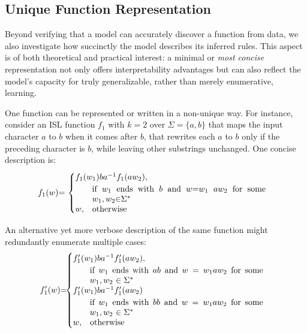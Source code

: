 \subsection{Unique Function Representation}
Beyond verifying that a model can accurately discover a function from data, we also investigate how succinctly the model describes its inferred rules. This aspect is of both theoretical and practical interest: a minimal or \emph{most concise} representation not only offers interpretability advantages but can also reflect the model's capacity for truly generalizable, rather than merely enumerative, learning. 

One function can be represented or written in a non-unique way. For instance, consider an ISL function $f_1$ with $k=2$ over $\Sigma = \{a, b\}$ that maps the input character $a$ to $b$ when it comes after $b$, that rewrites each $a$ to $b$ only if the preceding character is $b$, while leaving other substrings unchanged. One concise description is:
\begin{equation}
\hspace{-3mm} f_1(w) {=}\,
  \begin{cases}
 f_1(w_1)ba^{-1}f_1(aw_2), \\
 \quad\quad \parbox[t]{0.6\linewidth}{
        if $w_1$ ends with $b$ and 
        $w {=}w_1$ $aw_2$ for some $w_1, w_2 {\in} \Sigma^*$
      }\\
 w, \,\,\,\,\, \text{otherwise}
  \end{cases}
\hspace{-10pt} 
\end{equation}

An alternative yet more verbose description of the same function might redundantly enumerate multiple cases:
\begin{equation} 
\hspace{-3mm} f_1'(w) {=}
\!\!\begin{cases} 
f_1'(w_1)ba^{-1}f_1'(aw_2), \\
 \quad\quad \parbox[t]{0.6\linewidth}{
 if $w_1$ ends with $ab$ and $w = w_1aw_2$ for some $w_1, w_2$ $\in\Sigma^*$ } \\
f_1'(w_1)ba^{-1}f_1'(aw_2) \\
\quad\quad \parbox[t]{0.6\linewidth}{ 
 if $w_1$ ends with $bb$ and $w = w_1aw_2$ for some $w_1, w_2$ $\in\Sigma^*$ }\\
w,\,\,\,\,\, \text{otherwise}
\end{cases} 
\hspace{-10pt}
\end{equation}

